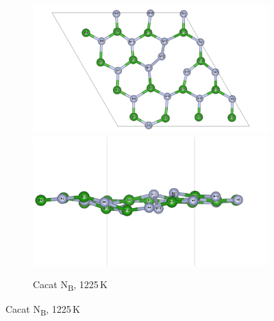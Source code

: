 \begin{figure}[htbp]
\begin{subfigure}{\textwidth}
    \centering
    \includegraphics[width=0.49\linewidth]{gambar_hasil/hBN_NN_1225K.png}\hfill
    \includegraphics[width=0.49\linewidth]{gambar_hasil/hBN_NN_side_1225K.png}
    \caption{Cacat N\textsubscript{B}, 1225 K}
    \label{subfig:md_nn_1225k}
  \end{subfigure}
\end{figure}


